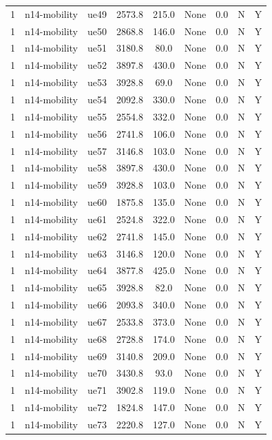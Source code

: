 \begin{table}[ht]
\begin{tabular}{|c|c|c|c|c|c|c|c|c|}
1 & n14-mobility & ue49 & 2573.8 & 215.0 & None & 0.0 & N & Y \\
1 & n14-mobility & ue50 & 2868.8 & 146.0 & None & 0.0 & N & Y \\
1 & n14-mobility & ue51 & 3180.8 & 80.0 & None & 0.0 & N & Y \\
1 & n14-mobility & ue52 & 3897.8 & 430.0 & None & 0.0 & N & Y \\
1 & n14-mobility & ue53 & 3928.8 & 69.0 & None & 0.0 & N & Y \\
1 & n14-mobility & ue54 & 2092.8 & 330.0 & None & 0.0 & N & Y \\
1 & n14-mobility & ue55 & 2554.8 & 332.0 & None & 0.0 & N & Y \\
1 & n14-mobility & ue56 & 2741.8 & 106.0 & None & 0.0 & N & Y \\
1 & n14-mobility & ue57 & 3146.8 & 103.0 & None & 0.0 & N & Y \\
1 & n14-mobility & ue58 & 3897.8 & 430.0 & None & 0.0 & N & Y \\
1 & n14-mobility & ue59 & 3928.8 & 103.0 & None & 0.0 & N & Y \\
1 & n14-mobility & ue60 & 1875.8 & 135.0 & None & 0.0 & N & Y \\
1 & n14-mobility & ue61 & 2524.8 & 322.0 & None & 0.0 & N & Y \\
1 & n14-mobility & ue62 & 2741.8 & 145.0 & None & 0.0 & N & Y \\
1 & n14-mobility & ue63 & 3146.8 & 120.0 & None & 0.0 & N & Y \\
1 & n14-mobility & ue64 & 3877.8 & 425.0 & None & 0.0 & N & Y \\
1 & n14-mobility & ue65 & 3928.8 & 82.0 & None & 0.0 & N & Y \\
1 & n14-mobility & ue66 & 2093.8 & 340.0 & None & 0.0 & N & Y \\
1 & n14-mobility & ue67 & 2533.8 & 373.0 & None & 0.0 & N & Y \\
1 & n14-mobility & ue68 & 2728.8 & 174.0 & None & 0.0 & N & Y \\
1 & n14-mobility & ue69 & 3140.8 & 209.0 & None & 0.0 & N & Y \\
1 & n14-mobility & ue70 & 3430.8 & 93.0 & None & 0.0 & N & Y \\
1 & n14-mobility & ue71 & 3902.8 & 119.0 & None & 0.0 & N & Y \\
1 & n14-mobility & ue72 & 1824.8 & 147.0 & None & 0.0 & N & Y \\
1 & n14-mobility & ue73 & 2220.8 & 127.0 & None & 0.0 & N & Y \\

\end{tabular}
\end{table}
